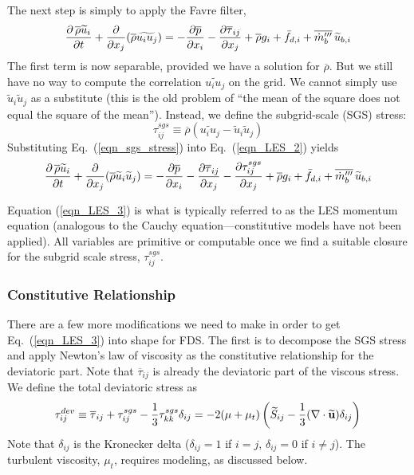 The next step is simply to apply the Favre filter,
\begin{equation}
\label{eqn_LES_2}
\frac{\partial \,\overline{\rho} \widetilde{u}_i}{\partial t} + \frac{\partial}{\partial x_j} (\overline{\rho} \widetilde{u_i u_j}) = -\frac{\partial \overline{p}}{\partial x_i} - \frac{\partial \overline{\tau}_{ij}}{\partial x_j} + \overline{\rho} g_i + \bar{f}_{d,i} + \overline{\dot{m}_b^{\prime\prime\prime}} \, \widetilde{u}_{b,i}
\end{equation}
The first term is now separable, provided we have a solution for $\overline{\rho}$. But we still have no way to compute the correlation $\widetilde{u_i u_j}$ on the grid. We cannot simply use $\widetilde{u}_i \widetilde{u}_j$ as a substitute (this is the old problem of ``the mean of the square does not equal the square of the mean''). Instead, we define the subgrid-scale (SGS) stress:
\begin{equation}
\label{eqn_sgs_stress}
\tau_{ij}^{sgs} \equiv \overline{\rho} ( \widetilde{u_i u_j} - \widetilde{u}_i \widetilde{u}_j )
\end{equation}
Substituting Eq.~(\ref{eqn_sgs_stress}) into Eq.~(\ref{eqn_LES_2}) yields
\begin{equation}
\label{eqn_LES_3}
\frac{\partial \,\overline{\rho} \widetilde{u}_i}{\partial t} + \frac{\partial}{\partial x_j} (\overline{\rho} \widetilde{u}_i \widetilde{u}_j) = -\frac{\partial \overline{p}}{\partial x_i} - \frac{\partial \overline{\tau}_{ij}}{\partial x_j} - \frac{\partial \tau_{ij}^{sgs}}{\partial x_j} + \overline{\rho} g_i + \bar{f}_{d,i} + \overline{\dot{m}_b^{\prime\prime\prime}} \, \widetilde{u}_{b,i}
\end{equation}

Equation (\ref{eqn_LES_3}) is what is typically referred to as the LES momentum equation (analogous to the Cauchy equation---constitutive models have not been applied).  All variables are primitive or computable once we find a suitable closure for the subgrid scale stress, $\tau_{ij}^{sgs}$.

\subsubsection*{Constitutive Relationship}

There are a few more modifications we need to make in order to get Eq.~(\ref{eqn_LES_3}) into shape for FDS.  The first is to decompose the SGS stress and apply Newton's law of viscosity as the constitutive relationship for the deviatoric part.  Note that $\overline{\tau}_{ij}$ is already the deviatoric part of the viscous stress.  We define the total deviatoric stress as
\begin{equation}
\label{eqn_newtons_law_sgs}
\tau_{ij}^{dev} \equiv \overline{\tau}_{ij} + \tau_{ij}^{sgs} - \frac{1}{3}\tau_{kk}^{sgs}\delta_{ij} = - 2 (\mu + \mu_t) \left(\widetilde{S}_{ij} - \frac{1}{3}(\nabla\cdot \widetilde{\mathbf{u}}) \delta_{ij} \right)
\end{equation}
Note that $\delta_{ij}$ is the Kronecker delta ($\delta_{ij}=1$ if $i=j$, $\delta_{ij}=0$ if $i\ne j$).  The turbulent viscosity, $\mu_t$, requires modeling, as discussed below.


